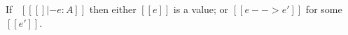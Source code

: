 \begin{theorem}[Progress]\label{lemma:union:progress}
If \ $[[ [] |- e : A]]$ then either $[[e]]$ is a value;
or $[[e --> e']]$ for some $[[e']]$.
\end{theorem}






